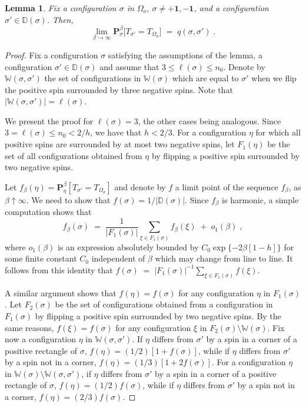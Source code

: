\documentclass[reqno]{amsart}
\newtheorem{lemma}[theorem]{Lemma}
\begin{document}
\begin{lemma}
\label{t03}
Fix a configuration $\sigma$ in $\Omega_o$, $\sigma \not = + {{\mathbf 1}}, -
{{\mathbf 1}}$, and a configuration $\sigma'\in {{\mathbb D}}(\sigma)$. Then,
\begin{equation*}
\lim_{\beta\to\infty} {{\mathbf P}}^\beta_\sigma \big[ T_{\sigma'} = 
T_{\Omega_\sigma} \big] \;=\; q(\sigma, \sigma')\;.
\end{equation*} 
\end{lemma}

\begin{proof}
Fix a configuration $\sigma$ satisfying the assumptions of the lemma,
a configuration $\sigma'\in {{\mathbb D}}(\sigma)$ and assume that $3\le \ell
(\sigma) \le n_0$.  Denote by ${{\mathbb W}}(\sigma, \sigma')$ the set of
configurations in ${{\mathbb W}}(\sigma)$ which are equal to $\sigma'$ when we
flip the positive spin surrounded by three negative spins. Note that
$|{{\mathbb W}}(\sigma, \sigma')| = \ell (\sigma)$.

We present the proof for $\ell(\sigma)= 3$, the other cases being
analogous.  Since $3 = \ell(\sigma) \le n_0 < 2/h$, we have that
$h<2/3$. For a configuration $\eta$ for which all positive spins are
surrounded by at most two negative spins, let $F_1(\eta)$ be the set
of all configurations obtained from $\eta$ by flipping a positive spin
surrounded by two negative spins.

Let $f_\beta(\eta) = {{\mathbf P}}^\beta_\eta [ T_{\sigma'} =
T_{\Omega_\sigma} ]$ and denote by $f$ a limit point of the sequence
$f_\beta$, as $\beta\uparrow\infty$. We need to show that $f(\sigma) =
1/|{{\mathbb D}}(\sigma)|$. Since $f_\beta$ is harmonic, a simple computation
shows that
\begin{equation}
\label{e02}
f_\beta(\sigma) \;=\; \frac 1{|F_1(\sigma)|} \sum_{\xi \in F_1(\sigma)}
f_\beta(\xi) \;+\; o_1(\beta)\;,
\end{equation}
where $o_1(\beta)$ is an expression absolutely bounded by $C_0 \exp\{
-2\beta [1-h]\}$ for some finite constant $C_0$ independent of $\beta$
which may change from line to line. It follows from this identity that
$f(\sigma) \;=\; |F_1(\sigma)|^{-1} \sum_{\xi\in F_1(\sigma)} f(\xi)$.

A similar argument shows that $f(\eta)=f(\sigma)$ for any
configuration $\eta$ in $F_1(\sigma)$. Let $F_2(\sigma)$ be the set of
configurations obtained from a configuration in $F_1(\sigma)$ by
flipping a positive spin surrounded by two negative spins. By the same
reasons, $f(\xi)=f(\sigma)$ for any configuration $\xi$ in
$F_2(\sigma) \setminus {{\mathbb W}}(\sigma)$. Fix now a configuration $\eta$
in ${{\mathbb W}}(\sigma, \sigma')$. If $\eta$ differs from $\sigma'$ by a
spin in a corner of a positive rectangle of $\sigma$, $f(\eta) = (1/2)
[1+f(\sigma)]$, while if $\eta$ differs from $\sigma'$ by a spin not
in a corner, $f(\eta) = (1/3) [1+2f(\sigma)]$. For a configuration
$\eta$ in ${{\mathbb W}}(\sigma) \setminus {{\mathbb W}}(\sigma, \sigma')$, if $\eta$
differs from $\sigma'$ by a spin in a corner of a positive rectangle
of $\sigma$, $f(\eta) = (1/2) f(\sigma)$, while if $\eta$ differs from
$\sigma'$ by a spin not in a corner, $f(\eta) = (2/3) f(\sigma)$.


\end{proof}
\end{document}
